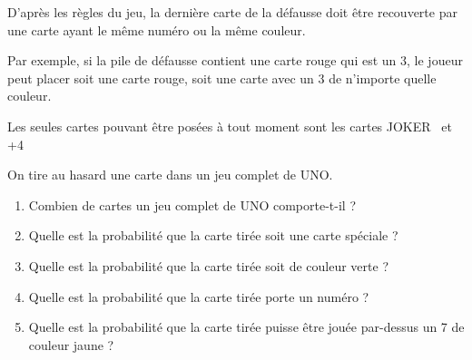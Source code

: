 \documentclass[oneside,12pt]{article}          %
\begin{document}
D'après les règles du jeu, la dernière carte de la défausse doit être recouverte par une carte ayant le même numéro ou la même couleur. 

Par exemple, si la pile de défausse contient une carte rouge qui est un 3, le joueur peut placer soit une carte rouge, soit une carte avec un 3 de n'importe quelle couleur.

Les seules cartes pouvant être posées à tout moment sont les cartes \og JOKER \fg \, et \og +4 \fg

On tire au hasard une carte dans un jeu complet de UNO.
\begin{enumerate}
	\item Combien de cartes un jeu complet de UNO comporte-t-il ?
	\item Quelle est la probabilité que la carte tirée soit une carte spéciale ?
	\item Quelle est la probabilité que la carte tirée soit de couleur verte ?
	\item Quelle est la probabilité que la carte tirée porte un numéro ?
	\item Quelle est la probabilité que la carte tirée puisse être jouée par-dessus un 7 de couleur jaune ?
\end{enumerate}
\end{document}
